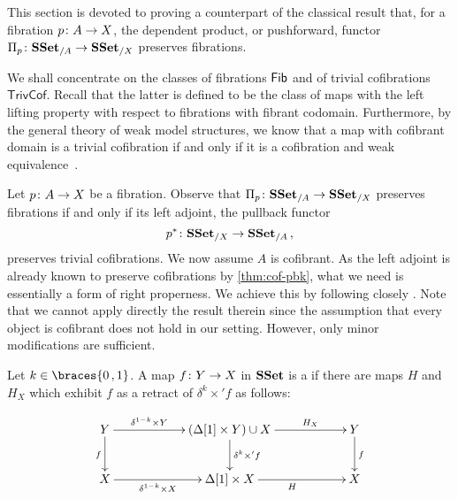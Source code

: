 \documentclass[reqno,10pt,a4paper,oneside,draft]{amsart}
\begin{document}
This section is devoted to proving a counterpart of the classical result that, for a fibration $p \colon A \rightarrow X$, the dependent product, or pushforward, functor $\Pi_p \colon \mathbf{SSet}_{/A} \to \mathbf{SSet}_{/X}$ preserves fibrations. 

\medskip

We shall concentrate on the classes of fibrations $\mathsf{Fib}$ and of trivial cofibrations $\mathsf{TrivCof}$. 
Recall that the latter is defined to be the class of maps with the left lifting property
with respect to fibrations with fibrant codomain. Furthermore, by the general theory of weak model
structures, we know that a map with cofibrant domain is a trivial cofibration if and only if it is a cofibration
and weak equivalence~\cite[Proposition~2.2.9]{henry2018wms}.  

\medskip

Let $p \colon A \rightarrow X$ be a fibration. Observe that $\Pi_p \colon \mathbf{SSet}_{/A} \to \mathbf{SSet}_{/X}$  preserves fibrations if and only if its left adjoint, the pullback functor
\[
p^* \colon \mathbf{SSet}_{/X} \to \mathbf{SSet}_{/A} \, , 
\]
preserves trivial cofibrations. We now assume  $A$ is cofibrant. 
As the left adjoint is already known to preserve cofibrations by \cref{thm:cof-pbk}, what we need is essentially a form of right properness. We achieve this by following closely \cite[Section~3]{gambino2017frobenius}. Note that we cannot apply directly the result therein since 
the assumption that every object is cofibrant does not hold in our setting. However, only minor modifications are sufficient.




\begin{definition} \label{def:strhtpyequiv} Let $k \in \braces{0 \, , 1 }$.
A map $f \colon Y \rightarrow X$ in $\mathbf{SSet}$ is a  if there are maps $H$ and $H_X$ which exhibit $f$ as a retract of $\delta^k \times ' f$ as follows:

\[
\xymatrix@C=2cm{
Y \ar[d]_{f} \ar[r]^-{\delta^{1-k} \times Y} & 
( \Delta[1] \times Y ) \cup X \ar[d]^{\delta^k \times' f} \ar[r]^-{H_X} & 
Y \ar[d]^{f} \\
X \ar[r]_-{\delta^{1-k} \times X}  & 
\Delta[1] \times X \ar[r]_{H} &
X  }
\]
\end{definition}
\end{document}
